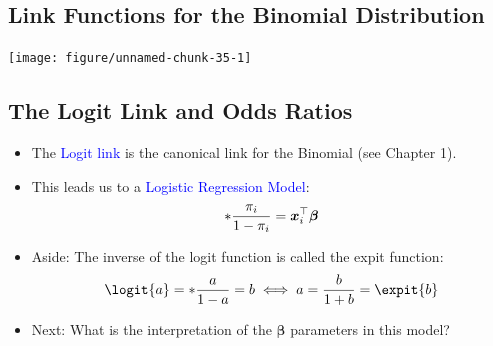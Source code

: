 \documentclass[oneside]{book}\usepackage[]{graphicx}\usepackage[svgnames]{xcolor}
\newenvironment{knitrout}{}{} %
\let\exp\relax%
\let\log\relax%
\providecommand{\Vector}[1]{\bm{#1}}%
\begin{document}
\subsection*{Link Functions for the Binomial Distribution}
\begin{knitrout}
\color{fgcolor}

{\centering \texttt{[image: figure/unnamed-chunk-35-1]} 

}


\end{knitrout}
\subsection*{The Logit Link and Odds Ratios}
\begin{itemize}
      \item The \textcolor{Blue}{Logit link} is the canonical link for the Binomial (see Chapter 1).
      \item This leads us to a \textcolor{Blue}{Logistic Regression Model}:
            \[ \log*{\frac{\pi_i}{1-\pi_i}}=\Vector{x}_i^\top \Vector{\beta} \]
      \item Aside: The inverse of the logit function is called the expit function:
            \[ \logit{a}=\log*{\frac{a}{1-a}}=b\iff a=\frac{\exp{b}}{1+\exp{b}}=\expit{b} \]
      \item Next: What is the interpretation of the $ \Vector{\beta} $ parameters in this model?
\end{itemize}
\end{document}
